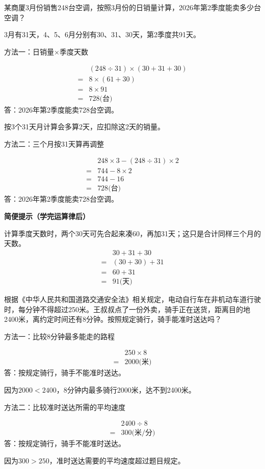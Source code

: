 某商厦3月份销售248台空调，按照3月份的日销量计算，2026年第2季度能卖多少台空调？\par
\begin{BookAnswer}
3月有31天，4、5、6月分别有30、31、30天，第2季度共91天。\par 方法一：日销量×季度天数\par \[\begin{aligned} &(248\div31)\times(30+31+30)\\={}&8\times(61+30)\\={}&8\times91\\={}&728\text{(台)}\end{aligned}\]答：2026年第2季度能卖728台空调。\par 按3个31天月计算会多算2天，应扣除这2天的销量。\par 方法二：三个月按31天算再调整\par \[\begin{aligned} &248\times3-(248\div31)\times2\\={}&744-8\times2\\={}&744-16\\={}&728\text{(台)}\end{aligned}\]答：2026年第2季度能卖728台空调。\par \par\textbf{简便提示（学完运算律后）}\par 计算季度天数时，两个30天可先合起来凑60，再加31天；这只是合计同样三个月的天数。\[\begin{aligned}&30+31+30\\={}&(30+30)+31\\={}&60+31\\={}&91\text{(天)}\end{aligned}\]
\end{BookAnswer}

根据《中华人民共和国道路交通安全法》相关规定，电动自行车在非机动车道行驶时，每分钟不得超过250米。王叔叔点了一份外卖，骑手正在送货，距离目的地2400米，离约定时间还有8分钟。按照规定骑行，骑手能准时送达吗？\par
\begin{BookAnswer}
方法一：比较8分钟最多能走的路程\par \[\begin{aligned} &250\times8\\={}&2000\text{(米)}\end{aligned}\]答：按规定骑行，骑手不能准时送达。\par 因为\(2000<2400\)，8分钟内最多骑行2000米，达不到2400米。\par 方法二：比较准时送达所需的平均速度\par \[\begin{aligned} &2400\div8\\={}&300\text{(米/分)}\end{aligned}\]答：按规定骑行，骑手不能准时送达。\par 因为\(300>250\)，准时送达需要的平均速度超过题目规定。
\end{BookAnswer}
